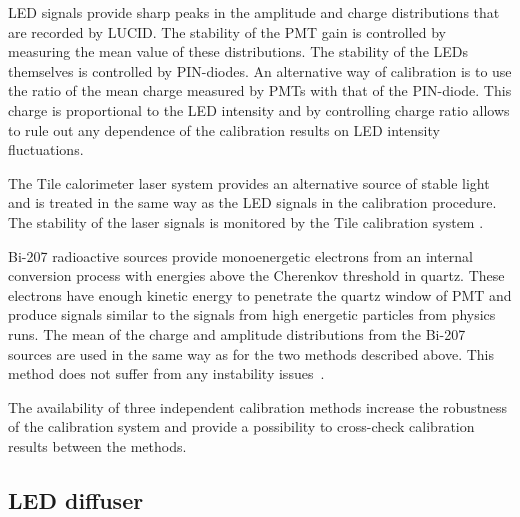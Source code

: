 LED signals provide sharp peaks in the amplitude and charge distributions that are recorded by LUCID.
The stability of the PMT gain is controlled by measuring the mean value of these distributions. 
The stability of the LEDs themselves is controlled by PIN-diodes.
An alternative way of calibration is to use the ratio of the mean charge measured by PMTs with that of the 
PIN-diode. 
This charge is proportional to the LED intensity and by controlling charge ratio allows to rule out any 
dependence of the calibration results on LED intensity fluctuations.

The Tile calorimeter laser system provides an alternative source of stable light and is treated in the same way
as the LED signals in the calibration procedure. 
The stability of the laser signals is monitored by the Tile calibration system \cite{atlasGeneral}.

Bi-207 radioactive sources provide monoenergetic electrons from an internal conversion process with energies 
above the Cherenkov threshold in quartz. These electrons
have enough kinetic energy to penetrate the quartz window of PMT and produce signals similar to the signals 
from high 
energetic particles from physics runs. The mean of the charge and amplitude 
distributions from the Bi-207 sources are used in the same way as for the two methods described above. 
This method does not suffer from any instability issues~\cite{Alberghi:2016tad}.

The availability of three independent calibration methods increase the robustness of the calibration system 
and provide a possibility to cross-check calibration results between the methods.

\subsection{LED diffuser}
\label{subsec:LEDDiffuser}





